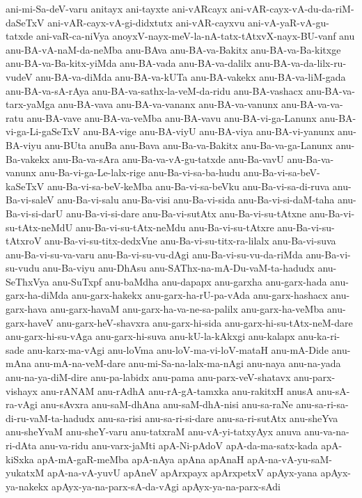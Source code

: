 {ani-mi-Sa-deV-varu
anitayx
ani-tayxte
ani-vARcayx
ani-vAR-cayx-vA-du-da-riM-daSeTxV
ani-vAR-cayx-vA-gi-didxtutx
ani-vAR-cayxvu
ani-vA-yaR-vA-gu-tatxde
ani-vaR-ca-niVya
anoyxV-nayx-meV-la-nA-tatx-tAtxvX-nayx-BU-vanf
anu
anu-BA-vA-naM-da-neMba
anu-BAva
anu-BA-va-Bakitx
anu-BA-va-Ba-kitxge
anu-BA-va-Ba-kitx-yiMda
anu-BA-vada
anu-BA-va-dalilx
anu-BA-va-da-lilx-ru-vudeV
anu-BA-va-diMda
anu-BA-va-kUTa
anu-BA-vakekx
anu-BA-va-liM-gada
anu-BA-va-sA-rAya
anu-BA-va-sathx-la-veM-da-ridu
anu-BA-vashacx
anu-BA-va-tarx-yaMga
anu-BA-vava
anu-BA-va-vananx
anu-BA-va-vanunx
anu-BA-va-va-ratu
anu-BA-vave
anu-BA-va-veMba
anu-BA-vavu
anu-BA-vi-ga-Lanunx
anu-BA-vi-ga-Li-gaSeTxV
anu-BA-vige
anu-BA-viyU
anu-BA-viya
anu-BA-vi-yanunx
anu-BA-viyu
anu-BUta
anuBa
anu-Bava
anu-Ba-va-Bakitx
anu-Ba-va-ga-Lanunx
anu-Ba-vakekx
anu-Ba-va-sAra
anu-Ba-va-vA-gu-tatxde
anu-Ba-vavU
anu-Ba-va-vanunx
anu-Ba-vi-ga-Le-lalx-rige
anu-Ba-vi-sa-ba-hudu
anu-Ba-vi-sa-beV-kaSeTxV
anu-Ba-vi-sa-beV-keMba
anu-Ba-vi-sa-beVku
anu-Ba-vi-sa-di-ruva
anu-Ba-vi-saleV
anu-Ba-vi-salu
anu-Ba-visi
anu-Ba-vi-sida
anu-Ba-vi-si-daM-taha
anu-Ba-vi-si-darU
anu-Ba-vi-si-dare
anu-Ba-vi-sutAtx
anu-Ba-vi-su-tAtxne
anu-Ba-vi-su-tAtx-neMdU
anu-Ba-vi-su-tAtx-neMdu
anu-Ba-vi-su-tAtxre
anu-Ba-vi-su-tAtxroV
anu-Ba-vi-su-titx-dedxVne
anu-Ba-vi-su-titx-ra-lilalx
anu-Ba-vi-suva
anu-Ba-vi-su-va-varu
anu-Ba-vi-su-vu-dAgi
anu-Ba-vi-su-vu-da-riMda
anu-Ba-vi-su-vudu
anu-Ba-viyu
anu-DhAsu
anu-SAThx-na-mA-Du-vaM-ta-hadudx
anu-SeThxVya
anu-SuTxpf
anu-baMdha
anu-dapapx
anu-garxha
anu-garx-hada
anu-garx-ha-diMda
anu-garx-hakekx
anu-garx-ha-rU-pa-vAda
anu-garx-hashacx
anu-garx-hava
anu-garx-havaM
anu-garx-ha-va-ne-sa-palilx
anu-garx-ha-veMba
anu-garx-haveV
anu-garx-heV-shavxra
anu-garx-hi-sida
anu-garx-hi-su-tAtx-neM-dare
anu-garx-hi-su-vAga
anu-garx-hi-suva
anu-kU-la-kAkxgi
anu-kalapx
anu-ka-ri-sade
anu-karx-ma-vAgi
anu-loVma
anu-loV-ma-vi-loV-mataH
anu-mA-Dide
anu-mAna
anu-mA-na-veM-dare
anu-mi-Sa-na-lalx-ma-nAgi
anu-naya
anu-na-yada
anu-na-ya-diM-dire
anu-pa-labidx
anu-pama
anu-parx-veV-shatavx
anu-parx-vishayx
anu-rANAM
anu-rAdhA
anu-rA-gA-tamxka
anu-rakitxH
anusA
anu-sA-ra-vAgi
anu-sAvxra
anu-saM-dhAna
anu-saM-dhA-nisi
anu-sa-raNe
anu-sa-ri-sa-di-ru-vaM-ta-hadudx
anu-sa-risi
anu-sa-ri-si-dare
anu-sa-ri-sutAtx
anu-sheYva
anu-sheYvaM
anu-sheY-varu
anu-tatxraM
anu-vA-yi-tatxyAyx
anuva
anu-va-na-ri-dAta
anu-va-ridu
anu-varx-jaMti
apA-Ni-pAdoV
apA-da-ma-satx-kada
apA-kiSxka
apA-mA-gaR-meMba
apA-nAya
apAna
apAnaH
apA-na-vA-yu-saM-yukatxM
apA-na-vA-yuvU
apAneV
apArxpayx
apArxpetxV
apAyx-yana
apAyx-ya-nakekx
apAyx-ya-na-parx-sA-da-vAgi
apAyx-ya-na-parx-sAdi
}
